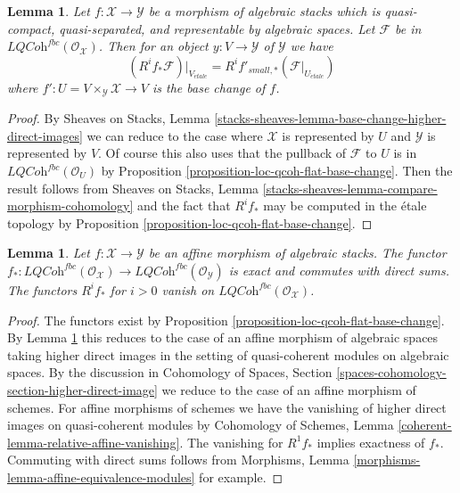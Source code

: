 \documentclass{stacks-project}
\theoremstyle{plain}
\newtheorem{lemma}[subsection]{Lemma}
\theoremstyle{definition}
\theoremstyle{remark}
\numberwithin{equation}{subsection}
\def\etale{{\acute{e}tale}}
\begin{document}
\begin{lemma}
\label{lemma-loc-qcoh-fbc-compute-higher-direct-image}
Let $f : \mathcal{X} \to \mathcal{Y}$ be a morphism of algebraic stacks
which is quasi-compact, quasi-separated, and
representable by algebraic spaces. Let $\mathcal{F}$ be in
$\textit{LQCoh}^{fbc}(\mathcal{O}_\mathcal{X})$.
Then for an object $y : V \to \mathcal{Y}$ of $\mathcal{Y}$ we have
$$
(R^if_*\mathcal{F})|_{V_\etale} = R^if'_{small, *}(\mathcal{F}|_{U_\etale})
$$
where $f' : U = V \times_\mathcal{Y} \mathcal{X} \to V$ is the base
change of $f$.
\end{lemma}

\begin{proof}
By Sheaves on Stacks, Lemma
\ref{stacks-sheaves-lemma-base-change-higher-direct-images}
we can reduce to the case where $\mathcal{X}$
is represented by $U$ and $\mathcal{Y}$ is
represented by $V$. Of course this also uses that the pullback of
$\mathcal{F}$ to $U$ is in $\textit{LQCoh}^{fbc}(\mathcal{O}_U)$
by Proposition \ref{proposition-loc-qcoh-flat-base-change}.
Then the result follows from
Sheaves on Stacks, Lemma
\ref{stacks-sheaves-lemma-compare-morphism-cohomology}
and the fact that $R^if_*$ may be computed in the
\'etale topology by
Proposition \ref{proposition-loc-qcoh-flat-base-change}.
\end{proof}

\begin{lemma}
\label{lemma-loc-qcoh-fbc-affine-direct-image}
Let $f : \mathcal{X} \to \mathcal{Y}$ be an affine morphism of algebraic
stacks. The functor $f_* : \textit{LQCoh}^{fbc}(\mathcal{O}_\mathcal{X}) \to
\textit{LQCoh}^{fbc}(\mathcal{O}_\mathcal{Y})$ is exact and commutes
with direct sums. The functors $R^if_*$ for $i > 0$ vanish on
$\textit{LQCoh}^{fbc}(\mathcal{O}_\mathcal{X})$.
\end{lemma}

\begin{proof}
The functors exist by Proposition \ref{proposition-loc-qcoh-flat-base-change}.
By Lemma \ref{lemma-loc-qcoh-fbc-compute-higher-direct-image}
this reduces to the case of an affine morphism of algebraic spaces
taking higher direct images in the setting of quasi-coherent
modules on algebraic spaces. By the discussion in
Cohomology of Spaces, Section
\ref{spaces-cohomology-section-higher-direct-image}
we reduce to the case of an affine morphism of schemes.
For affine morphisms of schemes we have the vanishing of
higher direct images on quasi-coherent modules by
Cohomology of Schemes, Lemma \ref{coherent-lemma-relative-affine-vanishing}.
The vanishing for $R^1f_*$ implies exactness of $f_*$.
Commuting with direct sums follows from
Morphisms, Lemma \ref{morphisms-lemma-affine-equivalence-modules}
for example.
\end{proof}
\end{document}
